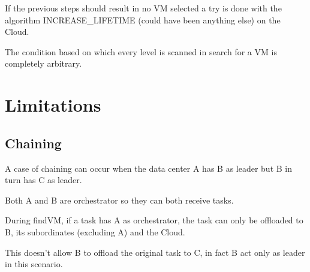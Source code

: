 \documentclass[12pt, a4paper]{report} %
\begin{document}
If the previous steps should result in no VM selected a try is done with the algorithm INCREASE\_LIFETIME (could have been anything else) on the Cloud.

The condition based on which every level is scanned in search for a VM is completely arbitrary.

\section*{Limitations}
\subsection*{Chaining}
A case of chaining can occur when the data center A has B as leader but B in turn has C as leader.

Both A and B are orchestrator so they can both receive tasks.

During findVM, if a task has A as orchestrator, the task can only be offloaded to B, its subordinates (excluding A) and the Cloud.

This doesn't allow B to offload the original task to C, in fact B act only as leader in this scenario.
\end{document}
